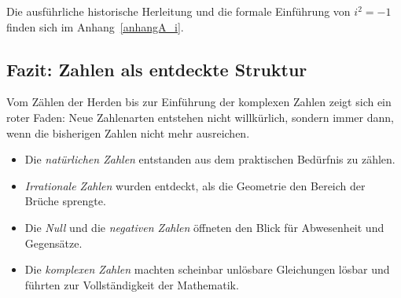 Die ausführliche historische Herleitung und die formale Einführung von $i^2=-1$ 
finden sich im Anhang~\ref{anhangA_i}.


\subsection{Fazit: Zahlen als entdeckte Struktur}

Vom Zählen der Herden bis zur Einführung der komplexen Zahlen zeigt sich ein roter Faden: 
Neue Zahlenarten entstehen nicht willkürlich, sondern immer dann, wenn die bisherigen 
Zahlen nicht mehr ausreichen.  

\begin{itemize}
	\item Die \emph{natürlichen Zahlen} entstanden aus dem praktischen Bedürfnis zu zählen.  
	\item \emph{Irrationale Zahlen} wurden entdeckt, als die Geometrie den Bereich der Brüche sprengte.  
	\item Die \emph{Null} und die \emph{negativen Zahlen} öffneten den Blick für Abwesenheit und Gegensätze.  
	\item Die \emph{komplexen Zahlen} machten scheinbar unlösbare Gleichungen lösbar und führten zur Vollständigkeit der Mathematik.  
\end{itemize}


